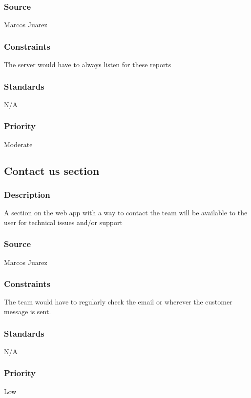 \subsubsection{Source}
Marcos Juarez
\subsubsection{Constraints}
The server would have to always listen for these reports
\subsubsection{Standards}
N/A
\subsubsection{Priority}
Moderate

\subsection{Contact us section}
\subsubsection{Description}
A section on the web app with a way to contact the team will be available to the user for technical issues and/or support
\subsubsection{Source}
Marcos Juarez
\subsubsection{Constraints}
The team would have to regularly check the email or wherever the customer message is sent.
\subsubsection{Standards}
N/A
\subsubsection{Priority}
Low